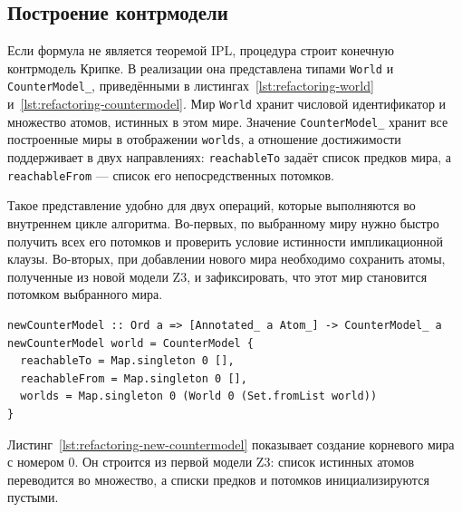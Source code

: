 \documentclass[14pt, russian]{scrartcl}
\begin{document}
\subsection{Построение контрмодели}

Если формула не является теоремой IPL, процедура строит конечную контрмодель
Крипке. В реализации она представлена типами \texttt{World} и
\texttt{CounterModel\_}, приведёнными в листингах~\ref{lst:refactoring-world}
и~\ref{lst:refactoring-countermodel}. Мир \texttt{World} хранит числовой
идентификатор и множество атомов, истинных в этом мире. Значение
\texttt{CounterModel\_} хранит все построенные миры в отображении
\texttt{worlds}, а отношение достижимости поддерживает в двух направлениях:
\texttt{reachableTo} задаёт список предков мира, а \texttt{reachableFrom} ---
список его непосредственных потомков.

Такое представление удобно для двух операций, которые выполняются во внутреннем
цикле алгоритма. Во-первых, по выбранному миру нужно быстро получить всех его
потомков и проверить условие истинности импликационной клаузы. Во-вторых, при
добавлении нового мира необходимо сохранить атомы, полученные из новой модели
Z3, и зафиксировать, что этот мир становится потомком выбранного мира.

\begin{listing}[!htb]
\caption{Создание начальной контрмодели \texttt{newCounterModel}}
\label{lst:refactoring-new-countermodel}
\begin{verbatim}
newCounterModel :: Ord a => [Annotated_ a Atom_] -> CounterModel_ a
newCounterModel world = CounterModel {
  reachableTo = Map.singleton 0 [],
  reachableFrom = Map.singleton 0 [],
  worlds = Map.singleton 0 (World 0 (Set.fromList world))
}
\end{verbatim}
\end{listing}

Листинг~\ref{lst:refactoring-new-countermodel} показывает создание корневого
мира с номером $0$. Он строится из первой модели Z3: список истинных атомов
переводится во множество, а списки предков и потомков инициализируются пустыми.
\end{document}
